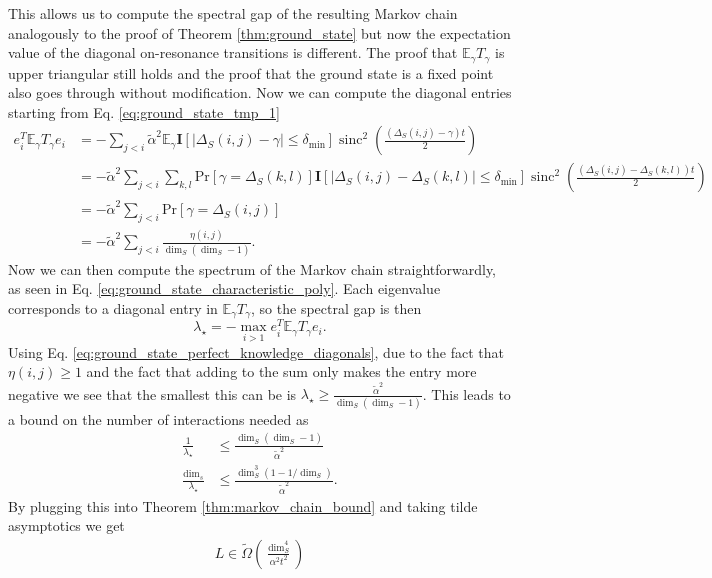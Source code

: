 \documentclass{article}
\newcommand{\parens}[1]{\left( #1 \right)}
\newcommand{\EE}{\mathbb{E}}
\newcommand{\prob}[1]{\text{Pr}\left[ #1 \right]}
\DeclareMathOperator{\sinc}{sinc}
\begin{document}
This allows us to compute the spectral gap of the resulting Markov chain analogously to the proof of Theorem \ref{thm:ground_state} but now the expectation value of the diagonal on-resonance transitions is different. The proof that $\EE_\gamma T_\gamma$ is upper triangular still holds and the proof that the ground state is a fixed point also goes through without modification. Now we can compute the diagonal entries starting from Eq. \eqref{eq:ground_state_tmp_1}
\begin{align}
    e_i^T \EE_\gamma T_\gamma e_i &= -   \sum_{j < i} \widetilde{\alpha}^2 \EE_\gamma \mathbf{I}[|\Delta_S(i,j) - \gamma| \le \delta_{\min}] \sinc^2 \left( \frac{(\Delta_S(i, j) - \gamma) t}{2} \right) \\
    &= - \widetilde{\alpha}^2 \sum_{j < i} \sum_{k, l} \prob{\gamma = \Delta_S(k,l)} \mathbf{I}[|\Delta_S(i,j) - \Delta_S(k,l)| \le \delta_{\min}] \sinc^2 \left( \frac{(\Delta_S(i, j) - \Delta_S(k,l)) t}{2} \right) \\
    &= - \widetilde{\alpha}^2 \sum_{j < i} \prob{\gamma = \Delta_S(i, j)} \\
    &= - \widetilde{\alpha}^2 \sum_{j < i} \frac{\eta(i,j)}{\dim_S (\dim_S - 1)}. \label{eq:ground_state_perfect_knowledge_diagonals}
\end{align}
Now we can then compute the spectrum of the Markov chain straightforwardly, as seen in Eq. \eqref{eq:ground_state_characteristic_poly}. Each eigenvalue corresponds to a diagonal entry in $\EE_\gamma T_\gamma$, so the spectral gap is then
\begin{equation}
\lambda_\star = - \max_{i > 1} e_i^T \EE_\gamma T_\gamma e_i.
\end{equation}
Using Eq. \eqref{eq:ground_state_perfect_knowledge_diagonals}, due to the fact that $\eta(i, j) \ge 1$ and the fact that adding to the sum only makes the entry more negative we see that the smallest this can be is $\lambda_\star \ge \frac{\widetilde{\alpha}^2}{\dim_S(\dim_S - 1)}$. This leads to a bound on the number of interactions needed as 
\begin{align}
    \frac{1}{\lambda_\star} &\le \frac{\dim_S (\dim_S - 1)}{\widetilde{\alpha}^2} \\
    \frac{\dim_s}{\lambda_\star} &\le \frac{\dim_S^3 (1 - 1/\dim_S)}{\widetilde{\alpha}^2}.
\end{align}
By plugging this into Theorem \ref{thm:markov_chain_bound} and taking tilde asymptotics we get
\begin{align}
    L \in \widetilde{\Omega} \parens{\frac{\dim_S^4}{\alpha^2 t^2}}
\end{align}
\end{document}
